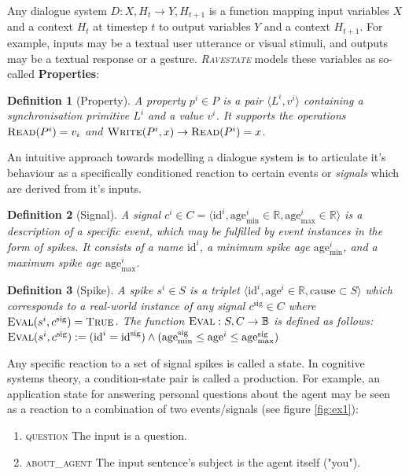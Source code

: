 \documentclass{article}
\newcommand{\rasta}{\textit{\textsc{Ravestate}}\xspace}
\newcommand{\mathsc}[1]{\text{\textsc{#1}}}
\newtheorem{definition}{Definition}
\begin{document}
\begin{multicols}{2}
Any dialogue system $D: X,H_t \rightarrow Y,H_{t+1}$ is a function mapping input variables $X$ and a context $H_t$ at timestep $t$ to output variables $Y$ and a context $H_{t+1}$. For example, inputs may be a textual user utterance or visual stimuli, and outputs may be a textual response or a gesture. \rasta models these variables as so-called \textbf{Properties}:

\begin{definition}[Property]
A property $p^i \in P$ is a pair $\langle L^i, v^i \rangle$ containing a synchronisation primitive $L^i$ and a value $v^i$. It supports the operations $\mathsc{Read}(P^i) = v_i$ and $\mathsc{Write}(P^i, x) \rightarrow \mathsc{Read}(P^i) = x$.
\end{definition}

An intuitive approach towards modelling a dialogue system is to articulate it's behaviour as a specifically conditioned reaction to certain events or \textit{signals} which are derived from it's inputs.

\begin{definition}[Signal]
A signal $c^i \in C = \langle \text{id}^i, \text{age}^i_\text{min} \in \mathbb{R}, \text{age}^i_\text{max} \in \mathbb{R} \rangle$ is a description of a specific event, which may be fulfilled by event instances in the form of \textit{spikes}. It consists of a name $\text{id}^i$, a minimum spike age $\text{age}^i_\text{min}$, and a maximum spike age $\text{age}^i_\text{max}$.
\end{definition}

\begin{definition}[Spike]
A spike $s^i \in S$ is a triplet $\langle \text{id}^i, \text{age}^i \in \mathbb{R}, \text{cause} \subset S \rangle$ which corresponds to a real-world instance of any signal $c^\text{sig} \in C$ where $\mathsc{Eval}(s^i, c^\text{sig}) =  \mathsc{True}$. The function $\mathsc{Eval}: S, C \rightarrow \mathbb{B}$ is defined as follows: $\mathsc{Eval}(s^i, c^\text{sig}) := (\text{id}^i = \text{id}^\text{sig}) \land (\text{age}^\text{sig}_\text{min} \leq \text{age}^i \leq \text{age}^\text{sig}_\text{max})$
\end{definition}

Any specific reaction to a set of signal spikes is called a state. In cognitive systems theory, a condition-state pair is called a production. For example, an application state for answering personal questions about the agent may be seen as a reaction to a combination of two events/signals (see figure \ref{fig:ex1}):
\begin{enumerate}
    \item \textsc{question} The input is a question.
    \item \textsc{about\_agent} The input sentence's subject is the agent itself ("you").
\end{enumerate}


\end{multicols}
\end{document}
